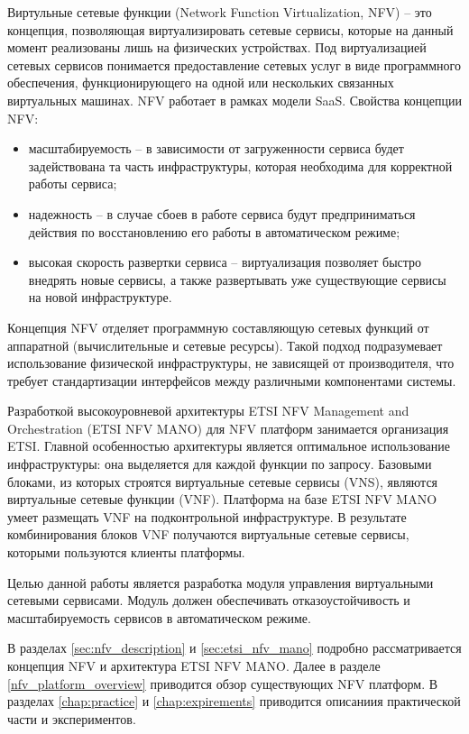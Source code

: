 \documentclass[oneside,final,14pt,a4paper]{extreport}
\begin{document}
Виртульные сетевые функции (Network Function Virtualization, NFV) -- это концепция, позволяющая виртуализировать сетевые сервисы, которые на данный момент реализованы лишь на физических устройствах. Под виртуализацией сетевых сервисов понимается предоставление сетевых услуг в виде программного обеспечения, функционирующего на одной или нескольких связанных виртуальных машинах. NFV работает в рамках модели SaaS. Свойства концепции NFV:
\begin{itemize}
	\item масштабируемость -- в зависимости от загруженности сервиса будет задействована та часть инфраструктуры, которая необходима для корректной работы сервиса;
	\item надежность -- в случае сбоев в работе сервиса будут предприниматься действия по восстановлению его работы в автоматическом режиме;
	\item высокая скорость развертки сервиса -- виртуализация позволяет быстро внедрять новые сервисы, а также развертывать уже существующие сервисы на новой инфраструктуре.
\end{itemize}

Концепция NFV отделяет программную составляющую сетевых функций от аппаратной (вычислительные и сетевые ресурсы). Такой подход подразумевает использование физической инфраструктуры, не зависящей от производителя, что требует стандартизации интерфейсов между различными компонентами системы.

Разработкой высокоуровневой архитектуры ETSI NFV Management and Orchestration (ETSI NFV MANO) для  NFV платформ занимается организация ETSI. Главной особенностью архитектуры является оптимальное использование инфраструктуры: она выделяется для каждой функции по запросу. Базовыми блоками, из которых строятся виртуальные сетевые сервисы (VNS), являются виртуальные сетевые функции (VNF). Платформа на базе ETSI NFV MANO умеет размещать VNF на подконтрольной инфраструктуре. В результате комбинирования блоков VNF получаются виртуальные сетевые сервисы, которыми пользуются клиенты платформы.

Целью данной работы является разработка модуля управления виртуальными сетевыми сервисами. Модуль должен обеспечивать отказоустойчивость и масштабируемость сервисов в автоматическом режиме.

В разделах \ref{sec:nfv_description} и \ref{sec:etsi_nfv_mano} подробно рассматривается концепция NFV и архитектура ETSI NFV MANO. Далее в разделе \ref{nfv_platform_overview} приводится обзор существующих NFV платформ. В разделах \ref{chap:practice} и \ref{chap:expirements} приводится описаниия практической части и экспериментов.
\end{document}
